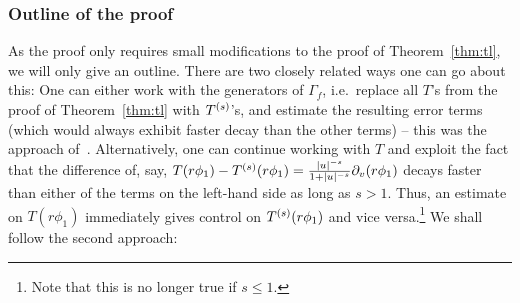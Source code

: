 \documentclass[11pt,english]{article}
\numberwithin{equation}{section}
\theoremstyle{remark}
\theoremstyle{plain}
\theoremstyle{remark}
\newcommand{\pv}{\partial_v}
\renewcommand{\(}{\left(}
\renewcommand{\)}{\right)}
\begin{document}
\subsubsection{Outline of the proof}
As the proof only requires small modifications to the proof of Theorem~\ref{thm:tl}, we will only give an outline. 
There are two closely related ways one can go about this:
One can either work with the generators of $\Gamma_f$, i.e.\ replace all $T$'s from the proof of Theorem~\ref{thm:tl} with $T^{(s)}$'s, and estimate the resulting error terms (which would always exhibit faster decay than the other terms) -- this was the approach of~\cite{I}.
Alternatively, one can continue working with $T$ and exploit the fact that the difference of, say, $T(r\phi_1)-\te(r\phi_1)=\frac{|u|^{-s}}{1+|u|^{-s}}\pv(r\phi_1)$ decays faster than either of the terms on the left-hand side as long as $s>1$. 
Thus, an estimate on $T(r\phi_1)$ immediately gives control on $T^{(s)}(r\phi_1)$ and vice versa.\footnote{Note that this is no longer true if $s\leq 1$.} 
We shall follow the second approach:
\end{document}
